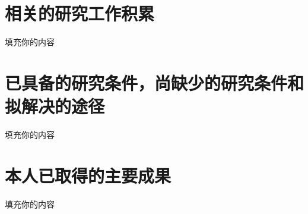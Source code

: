 \documentclass[
    UTF8,
    twoside,
    zihao=5,
    scheme=plain,
    heading=true,
]{ctexrep}
\theoremstyle{plain}
\theoremstyle{definition}
\theoremstyle{remark}
\begin{document}
\begin{framed}
\begin{spacing}{1.5}

\section{相关的研究工作积累}

填充你的内容

\section{已具备的研究条件，尚缺少的研究条件和拟解决的途径}

填充你的内容

\newpage

\section{本人已取得的主要成果}

填充你的内容

\end{spacing}
\end{framed}

\newpage
\end{document}

